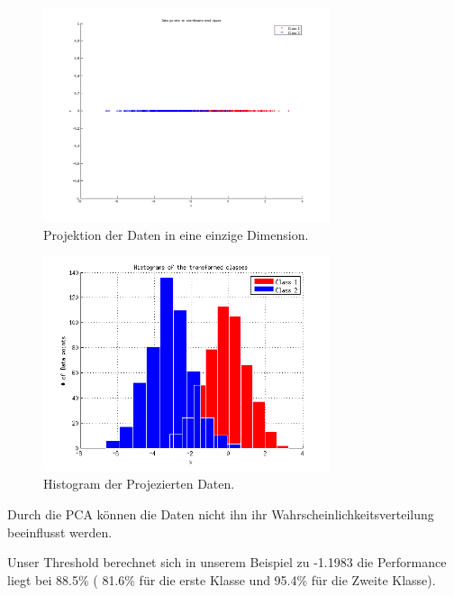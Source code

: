 \begin{figure}[h!]
  \begin{center}
    \includegraphics[width=0.75\textwidth]{./figures/4_one_dim}
    \caption{Projektion der Daten in eine einzige Dimension.}
    \label{fig:4_one_dim}
  \end{center}
\end{figure}

\begin{figure}[h!]
  \begin{center}
    \includegraphics[width=0.75\textwidth]{./figures/4_Histogram}
    \caption{Histogram der Projezierten Daten.}
    \label{fig:4_Histogram}
  \end{center}
\end{figure}


Durch die PCA können die Daten nicht ihn ihr Wahrscheinlichkeitsverteilung beeinflusst werden.

Unser Threshold berechnet sich in unserem Beispiel zu -1.1983 die Performance liegt bei 88.5\% ( 81.6\% für die erste Klasse und 95.4\% für die Zweite Klasse).

